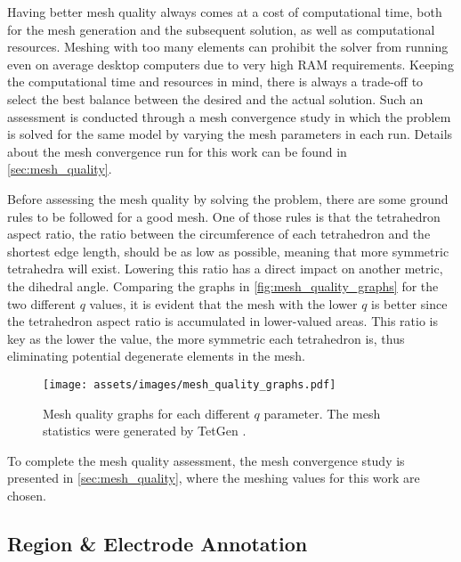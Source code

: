 Having better mesh quality always comes at a cost of computational time, both for the mesh generation and the subsequent solution, as well as computational resources. Meshing with too many elements can prohibit the solver from running even on average desktop computers due to very high \gls{RAM} requirements. Keeping the computational time and resources in mind, there is always a trade-off to select the best balance between the desired and the actual solution. Such an assessment is conducted through a mesh convergence study in which the problem is solved for the same model by varying the mesh parameters in each run. Details about the mesh convergence run for this work can be found in \ref{sec:mesh_quality}.

Before assessing the mesh quality by solving the problem, there are some ground rules to be followed for a good mesh. One of those rules is that the \gls{tetrahedron aspect ratio}, the ratio between the circumference of each tetrahedron and the shortest edge length, should be as low as possible, meaning that more symmetric tetrahedra will exist. Lowering this ratio has a direct impact on another metric, the dihedral angle. Comparing the graphs in \autoref{fig:mesh_quality_graphs} for the two different $q$ values, it is evident that the mesh with the lower $q$ is better since the \gls{tetrahedron aspect ratio} is accumulated in lower-valued areas. This ratio is key as the lower the value, the more symmetric each tetrahedron is, thus eliminating potential degenerate elements in the mesh.

\begin{figure}[H]
    \centering
    \texttt{[image: assets/images/mesh\_quality\_graphs.pdf]}
    \caption[Mesh quality graphs for each different $q$ parameter]{Mesh quality graphs for each different $q$ parameter. The mesh statistics were generated by TetGen \cite{tetgen}.}
    \label{fig:mesh_quality_graphs}
\end{figure}

To complete the mesh quality assessment, the mesh convergence study is presented in \autoref{sec:mesh_quality}, where the meshing values for this work are chosen.

\subsection{Region \& Electrode Annotation}
\label{subsec:elec_annotation}

